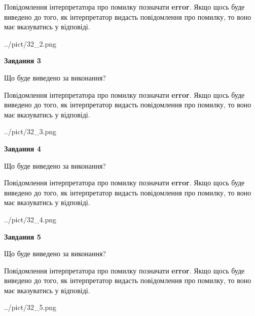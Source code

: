 \documentclass[12pt, ukrainian]{article}
\begin{document}
{\begin {large}
Повідомлення інтерпретатора про помилку позначати \textbf{error}.
Якщо щось буде виведено до того, як інтерпретатор видасть повідомлення про помилку, 
то воно має вказуватись у відповіді. \par


\begin{center}
	{../pict/32_2.png}
\end{center}
\newpage

{\begin {center}\textbf{Завдання 3}\end {center}}\par
Що буде виведено за виконання?

Повідомлення інтерпретатора про помилку позначати \textbf{error}.
Якщо щось буде виведено до того, як інтерпретатор видасть повідомлення про помилку, 
то воно має вказуватись у відповіді. \par


\begin{center}
	{../pict/32_3.png}
\end{center}
\newpage

{\begin {center}\textbf{Завдання 4}\end {center}}\par
Що буде виведено за виконання?

Повідомлення інтерпретатора про помилку позначати \textbf{error}.
Якщо щось буде виведено до того, як інтерпретатор видасть повідомлення про помилку, 
то воно має вказуватись у відповіді. \par


\begin{center}
	{../pict/32_4.png}
\end{center}
\newpage

{\begin {center}\textbf{Завдання 5}\end {center}}\par
Що буде виведено за виконання?

Повідомлення інтерпретатора про помилку позначати \textbf{error}.
Якщо щось буде виведено до того, як інтерпретатор видасть повідомлення про помилку, 
то воно має вказуватись у відповіді. \par


\begin{center}
	{../pict/32_5.png}
\end{center}
\newpage


\end{large}}
\end{document}
